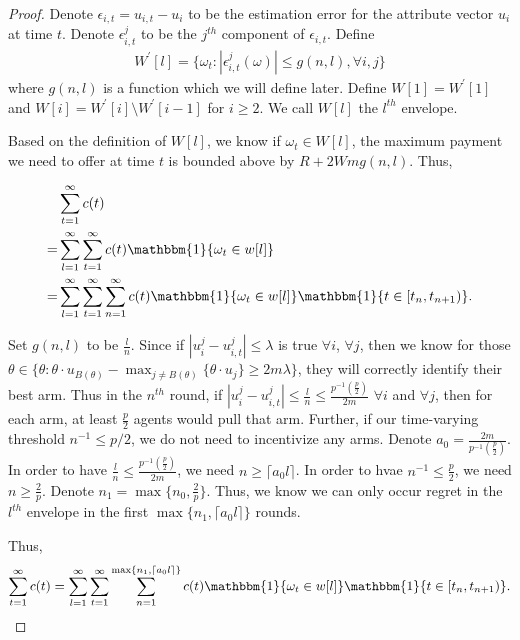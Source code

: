 \documentclass{article}
\begin{document}
\begin{proof}
Denote $\epsilon_{i,t}=u_{i,t}-u_{i}$ to be the estimation error for the attribute vector $u_i$ at time $t$. Denote $\epsilon_{i,t}^{j}$ to be the $j^{th}$ component of $\epsilon_{i,t}$. Define
\begin{align}
W^{'}[l] = \{\omega_t:|\epsilon_{i,t}^{j}(\omega)|\leq g(n,l), \forall i,j\}\nonumber
\end{align}
where $g(n,l)$ is a function which we will define later. Define $W[1] = W^{'}[1]$ and $W[i] = W^{'}[i]\setminus W^{'}[i-1]$ for $i\geq 2$. We call $W[l]$ the $l^{th}$ envelope. 

Based on the definition of $W[l]$, we know if $\omega_t\in W[l]$, the maximum payment we need to offer at time $t$ is bounded above by $R+2Wmg(n,l)$. Thus,

\begin{align}
&\sum_{t=1}^{\infty}c(t) \nonumber \\
=&\sum_{l=1}^{\infty}\sum_{t=1}^{\infty}c(t)\mathbbm{1}\{\omega_{t}\in w[l]\} \nonumber \\
=&\sum_{l=1}^{\infty}\sum_{t=1}^{\infty}\sum_{n=1}^{\infty}c(t)\mathbbm{1}\{\omega_{t}\in w[l]\}\mathbbm{1}\{t\in [t_n,t_{n+1})\}. \nonumber
\end{align}

Set $g(n,l)$ to be $\frac{l}{n}$. Since if $|u_{i}^{j}-u_{i,t}^{j}|\leq \lambda$ is true $\forall i$, $\forall j$, then we know for those $\theta\in \{\theta:\theta\cdot u_{B(\theta)}-\max_{j\neq B(\theta)}\{\theta \cdot u_{j}\}\geq 2m\lambda\}$, they will correctly identify their best arm. Thus in the $n^{th}$ round, if $|u_{i}^{j}-u_{i,t}^{j}|\leq \frac{l}{n} \leq \frac{p^{-1}(\frac{p}{2})}{2m}$ $\forall i$ and $\forall j$, then for each arm, at least $\frac{p}{2}$ agents would pull that arm. Further, if our time-varying threshold $n^{-1}\leq p/2$, we do not need to incentivize any arms. Denote $a_0=\frac{2m}{p^{-1}(\frac{p}{2})}$. In order to have $\frac{l}{n}\leq \frac{p^{-1}(\frac{p}{2})}{2m}$, we need $n\geq \lceil a_{0} l\rceil$. In order to hvae $n^{-1}\leq \frac{p}{2}$, we need $n\geq \frac{2}{p}$. Denote $n_1=\max\{n_{0}, \frac{2}{p}\}$. Thus, we know we can only occur regret in the $l^{th}$ envelope in the first $\max\{n_1,\lceil a_0 l\rceil\}$ rounds.

Thus,
\begin{align}
\sum_{t=1}^{\infty}c(t)=\sum_{l=1}^{\infty}\sum_{t=1}^{\infty}\sum_{n=1}^{\max\{n_1,\lceil a_0 l\rceil\}}c(t)\mathbbm{1}\{\omega_{t}\in w[l]\}\mathbbm{1}\{t\in [t_n,t_{n+1})\}. \nonumber
\end{align}


\end{proof}
\end{document}
